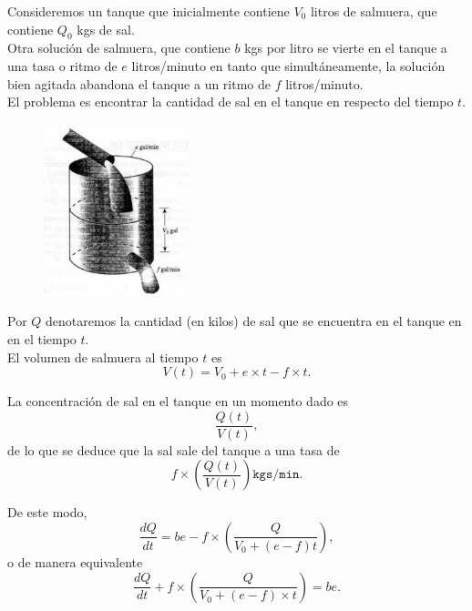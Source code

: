 	Consideremos un tanque que inicialmente contiene $V_{0}$ litros de salmuera, que contiene $Q_{0}$ kgs de sal.\\
	
	Otra solución de salmuera, que contiene $b$ kgs por litro se vierte en el tanque a una tasa o ritmo de $e$ litros/minuto en tanto que simultáneamente, la solución bien agitada abandona el tanque a un ritmo de $f$ litros/minuto.\\
	
	El problema es encontrar la cantidad de sal en el tanque en respecto del tiempo $t.$



	\begin{figure}
		\centering
		\includegraphics[height=5cm,keepaspectratio=true]{./edo/img020506.png}
		\label{fig:020506}
	\end{figure}
	




	Por $Q$ denotaremos la cantidad (en kilos) de sal que se encuentra en el tanque en en el tiempo $t.$\\
	
	El volumen de salmuera al tiempo $t$ es
	\begin{equation}
		\label{bron:7.7}
		V(t)=V_{0}+e\times t-f\times t.
	\end{equation}
	



	La concentración de sal en el tanque en un momento dado es $$\dfrac{Q(t)}{V(t)},$$ de lo que se deduce que la sal sale del tanque a una tasa de
	$$
	f \times \left( \dfrac{Q(t)}{V(t)} \right)
	\texttt{kgs/min.}
	$$



	De este modo,
	$$
	\dfrac{dQ}{dt}=be-f\times \left( \dfrac{Q}{V_{0}+(e-f)t} \right),
	$$
	o de manera equivalente
	\begin{equation}
		\label{bron:7.8}
		\dfrac{dQ}{dt}+f \times \left( \dfrac{Q}{V_{0}+(e-f)\times t} \right)=be.
	\end{equation}
	



